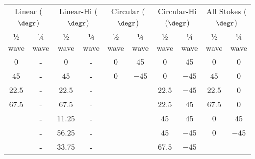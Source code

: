 \begin{table}[t]
    \begin{tabular}{cccccccccc}
        \hline
        \multicolumn{2}{c}{Linear ($\degr$)} & \multicolumn{2}{c}{Linear-Hi ($\degr$)} & \multicolumn{2}{c}{Circular ($\degr$)} & \multicolumn{2}{c}{Circular-Hi ($\degr$)} & \multicolumn{2}{c}{All Stokes ($\degr$)}                                              \\
        ½ wave                               & ¼ wave                                  & ½ wave                                 & ¼ wave                                    & ½ wave                                   & ¼ wave & ½ wave & ¼ wave & ½ wave & ¼ wave \\ \hline
        $0$                                  & -                                       & $0$                                    & -                                         & $0$                                      & $45$   & $0$    & $45$   & $0$    & $0$    \\
        $45$                                 & -                                       & $45$                                   & -                                         & $0$                                      & $-45$  & $0$    & $-45$  & $45$   & $0$    \\
        $22.5$                               & -                                       & $22.5$                                 & -                                         &                                          &        & $22.5$ & $-45$  & $22.5$ & $0$    \\
        $67.5$                               & -                                       & $67.5$                                 & -                                         &                                          &        & $22.5$ & $45$   & $67.5$ & $0$    \\
                                             & -                                       & $11.25$                                & -                                         &                                          &        & $45$   & $45$   & $0$    & $45$   \\
                                             & -                                       & $56.25$                                & -                                         &                                          &        & $45$   & $-45$  & $0$    & $-45$  \\
                                             & -                                       & $33.75$                                & -                                         &                                          &        & $67.5$ & $-45$  &        &        \\

\end{tabular}
\end{table}
